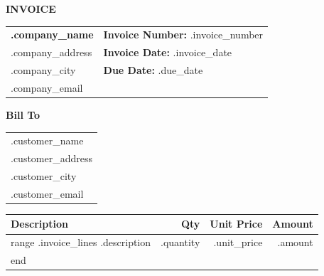 \documentclass[a4paper,11pt]{article}
\begin{document}

{\Huge \textbf{INVOICE}}

\vspace{0.5cm}

\begin{tabularx}{\textwidth}{X X}
\textbf{{.company_name}} &
\textbf{Invoice Number:} {{.invoice_number}} \\

{{.company_address}} &
\textbf{Invoice Date:} {{.invoice_date}} \\

{{.company_city}} &
\textbf{Due Date:} {{.due_date}} \\

{{.company_email}} &
\\
\end{tabularx}

\vspace{1cm}


\textbf{Bill To}

\vspace{0.2cm}

\begin{tabularx}{\textwidth}{X}
{{.customer_name}} \\
{{.customer_address}} \\
{{.customer_city}} \\
{{.customer_email}} \\
\end{tabularx}

\vspace{0.8cm}


\renewcommand{\arraystretch}{1.3}

\begin{longtable}{|p{6cm}|r|r|r|}
\hline
\textbf{Description} &
\textbf{Qty} &
\textbf{Unit Price} &
\textbf{Amount} \\
\hline
\endhead

{{range .invoice_lines}}
{{.description}} &
{{.quantity}} &
{{.unit_price}} &
{{.amount}} \\
\hline
{{end}}

\end{longtable}
\end{document}
